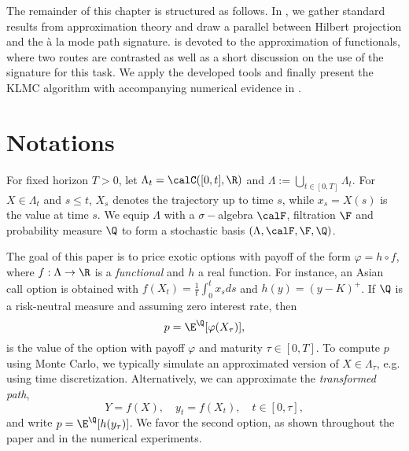 
The remainder of this chapter is structured as follows. In , we gather standard results from approximation theory and draw a %
parallel between Hilbert projection and the à la mode path signature. 
 is devoted to the approximation of functionals, where two routes are contrasted as well as a short discussion on the use of the signature for this task. %
We  apply the developed tools and finally present the KLMC algorithm with accompanying numerical evidence in .

\section{Notations}

For fixed horizon $T>0$, let $\Lambda_t = \calC([0,t],\R)$ and $\Lambda := \bigcup_{t\in[0,T]}\Lambda_t$.   For $X \in \Lambda_t$ and $s \le t$, $X_s$ denotes the  trajectory up to time $s$, while $x_s= X(s)$ is the value at time $s$. 
We equip $\Lambda$ with a $\sigma-$algebra $\calF$, filtration $\F$ and probability measure $\Q$ to form a stochastic basis $(\Lambda,\calF,\F, \Q)$. 

The goal of this paper is to price exotic options with payoff of the form $\varphi = h\circ f$, where  $f:\Lambda \to \R$ is a  \textit{functional} and  $h$ a real function. 
 For instance, an Asian call option is obtained with $f(X_t) = \frac{1}{t}\int_{0}^t x_s ds$ and $h(y) = (y-K)^+$. If $\Q$ is a risk-neutral measure and assuming zero interest rate, then 
 $$p = \E^{\Q}[\varphi(X_\tau)],$$ is the value of the  option with payoff $\varphi$ and maturity $\tau \in [0,T]$.  
To compute $p$ using Monte Carlo, we  typically simulate an approximated version of $X \in \Lambda_\tau$, e.g. using time discretization. Alternatively, we can approximate the  \textit{transformed path},
$$Y = f(X), \quad y_t = f(X_t), \quad  t\in [0,\tau],$$ and  write $p = \E^{\Q}[h(y_\tau)]$. We favor the second option, as shown throughout the paper and in the numerical experiments. 







%

